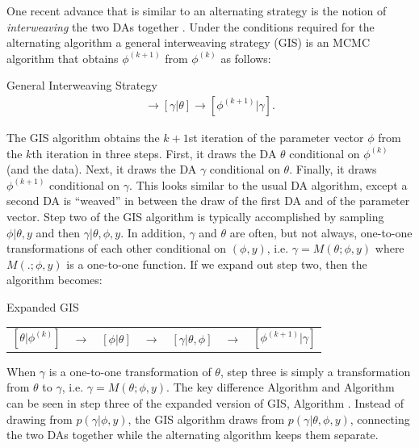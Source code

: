 \documentclass{article}
\begin{document}
One recent advance that is similar to an alternating strategy is the notion of {\it interweaving} the two DAs together \cite{yu2011center}. Under the conditions required for the alternating algorithm a general interweaving strategy (GIS) is an MCMC algorithm that obtains $\phi^{(k+1)}$ from $\phi^{(k)}$ as follows:
\begin{alg*}[GIS]General Interweaving Strategy\label{alg:GIS}
  \begin{align*}
    [\theta|\phi^{(k)}] \to [\gamma|\theta] \to [\phi^{(k+1)}|\gamma].
  \end{align*}
\end{alg*}
\noindent The GIS algorithm obtains the $k+1$st iteration of the parameter vector $\phi$ from the $k$th iteration in three steps. First, it draws the DA $\theta$ conditional on $\phi^{(k)}$ (and the data). Next, it draws the DA $\gamma$ conditional on $\theta$. Finally, it draws $\phi^{(k+1)}$ conditional on $\gamma$. This looks similar to the usual DA algorithm, except a second DA is ``weaved'' in between the draw of the first DA and of the parameter vector. Step two of the GIS algorithm is typically accomplished by sampling $\phi|\theta,y$ and then $\gamma|\theta,\phi,y$. In addition, $\gamma$ and $\theta$ are often, but not always, one-to-one transformations of each other conditional on $(\phi,y)$, i.e. $\gamma = M(\theta;\phi,y)$ where $M(.;\phi,y)$ is a one-to-one function. If we expand out step two, then the algorithm becomes:
\begin{alg*}[GIS-E]Expanded GIS\label{alg:GIS2}\\
  \begin{center}
    \begin{tabular}{lllllll}
      $[\theta|\phi^{(k)}]$& $\to$& $[\phi|\theta]$& $\to $&$[\gamma|\theta,\phi]$& $\to$& $[\phi^{(k+1)}|\gamma]$
    \end{tabular}
  \end{center}
\noindent \end{alg*}
When $\gamma$ is a one-to-one transformation of $\theta$, step three is simply a transformation from $\theta$ to $\gamma$, i.e. $\gamma=M(\theta;\phi,y)$. The key difference Algorithm  and Algorithm  can be seen in step three of the expanded version of GIS, Algorithm . Instead of drawing from $p(\gamma|\phi,y)$, the GIS algorithm draws from $p(\gamma|\theta,\phi,y)$, connecting the two DAs together while the alternating algorithm keeps them separate.
\end{document}
